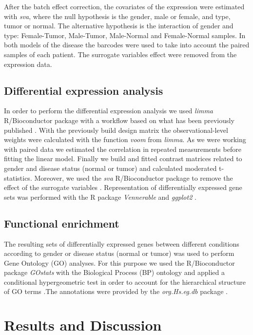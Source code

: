 \documentclass[9pt,twocolumn,twoside]{gsajnl}
\begin{document}
After the batch effect correction, the covariates of the expression were estimated with \textit{sva}, where the null hypothesis is the gender, male or female, and type, tumor or normal. The alternative hypothesis is the interaction of gender and type: Female-Tumor, Male-Tumor, Male-Normal and Female-Normal samples. In both models of the disease the barcodes were used to take into account the paired samples of each patient. The surrogate variables effect were removed from the expression data.

\subsection*{Differential expression analysis}
In order to perform the differential expression analysis we used \textit{limma} R/Bioconductor package with a workflow based on what has been previously published \citep{limma}. With the previously build design matrix the observational-level weights were calculated with the function \textit{voom} from \textit{limma}. As we were working with paired data we estimated the correlation in repeated measurements before fitting the linear model. Finally we build and fitted contrast matrices related to gender and disease status (normal or tumor) and calculated moderated t-statistics. Moreover, we used the \textit{sva} R/Bioconductor package to remove the effect of the surrogate variables \citep{sva}. Representation of differentially expressed gene sets was performed with the R package \textit{Vennerable} \citep{Venn} and \textit{ggplot2} \citep{ggplot2}.

\subsection*{Functional enrichment}
The resulting sets of differentially expressed genes between different conditions according to gender or disease status (normal or tumor) was used to perform Gene Ontology (GO) analyses. For this purpose we used the R/Bioconductor package \textit{GOstats} with the Biological Process (BP) ontology and applied a conditional hypergeometric test in order to account for the hierarchical structure of GO terms \citep{Gostats}.The annotations were provided by the \textit{org.Hs.eg.db} package \citep{org}. 


\section*{Results and Discussion}
\end{document}

